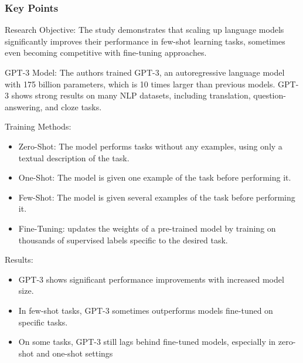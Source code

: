 \documentclass[11pt]{article}
\begin{document}
\subsubsection{Key Points}
Research Objective: The study demonstrates that scaling up language models significantly improves their performance in few-shot learning tasks, sometimes even becoming competitive with fine-tuning approaches.

GPT-3 Model: The authors trained GPT-3, an autoregressive language model with 175 billion parameters, which is 10 times larger than previous models. GPT-3 shows strong results on many NLP datasets, including translation, question-answering, and cloze tasks.

Training Methods:
\begin{itemize}
    \item Zero-Shot: The model performs tasks without any examples, using only a textual description of the task.
    \item One-Shot: The model is given one example of the task before performing it.
    \item Few-Shot: The model is given several examples of the task before performing it.
    \item Fine-Tuning: updates the weights of a pre-trained model by training on thousands of
supervised labels specific to the desired task.
\end{itemize}
Results:
\begin{itemize}
    \item GPT-3 shows significant performance improvements with increased model size.
    \item In few-shot tasks, GPT-3 sometimes outperforms models fine-tuned on specific tasks.
    \item On some tasks, GPT-3 still lags behind fine-tuned models, especially in zero-shot and one-shot settings
\end{itemize}
\end{document}
